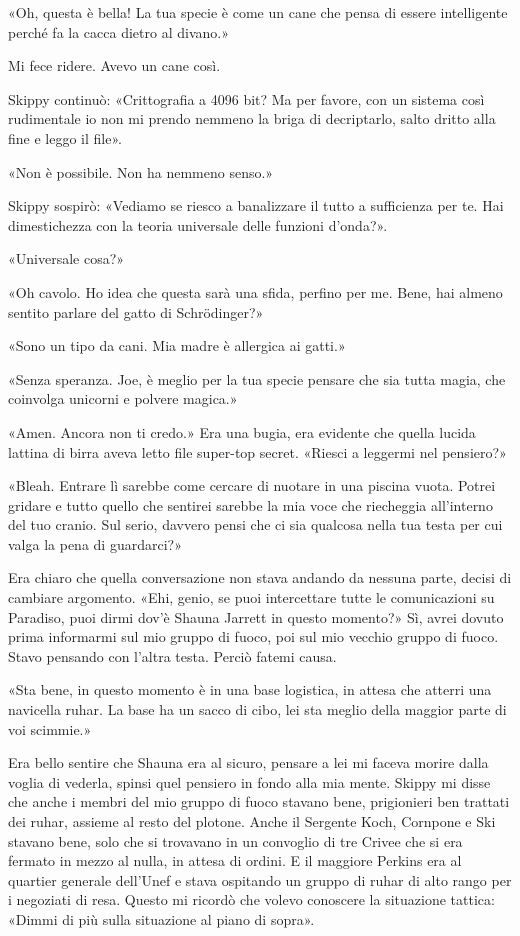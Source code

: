 «Oh, questa è bella! La tua specie è come un cane che pensa di essere
intelligente perché fa la cacca dietro al divano.»

Mi fece ridere. Avevo un cane così.

Skippy continuò: «Crittografia a 4096 bit? Ma per favore, con un sistema
così rudimentale io non mi prendo nemmeno la briga di decriptarlo, salto
dritto alla fine e leggo il file».

«Non è possibile. Non ha nemmeno senso.»

Skippy sospirò: «Vediamo se riesco a banalizzare il tutto a sufficienza
per te. Hai dimestichezza con la teoria universale delle funzioni
d'onda?».

«Universale cosa?»

«Oh cavolo. Ho idea che questa sarà una sfida, perfino per me. Bene, hai
almeno sentito parlare del gatto di Schrödinger?»

«Sono un tipo da cani. Mia madre è allergica ai gatti.»

«Senza speranza. Joe, è meglio per la tua specie pensare che sia tutta
magia, che coinvolga unicorni e polvere magica.»

«Amen. Ancora non ti credo.» Era una bugia, era evidente che quella
lucida lattina di birra aveva letto file super-top secret. «Riesci a
leggermi nel pensiero?»

«Bleah. Entrare lì sarebbe come cercare di nuotare in una piscina vuota.
Potrei gridare e tutto quello che sentirei sarebbe la mia voce che
riecheggia all'interno del tuo cranio. Sul serio, davvero pensi che ci
sia qualcosa nella tua testa per cui valga la pena di guardarci?»

Era chiaro che quella conversazione non stava andando da nessuna parte,
decisi di cambiare argomento. «Ehi, genio, se puoi intercettare tutte le
comunicazioni su Paradiso, puoi dirmi dov'è Shauna Jarrett in questo
momento?» Sì, avrei dovuto prima informarmi sul mio gruppo di fuoco, poi
sul mio vecchio gruppo di fuoco. Stavo pensando con l'altra testa.
Perciò fatemi causa.

«Sta bene, in questo momento è in una base logistica, in attesa che
atterri una navicella ruhar. La base ha un sacco di cibo, lei sta meglio
della maggior parte di voi scimmie.»

Era bello sentire che Shauna era al sicuro, pensare a lei mi faceva
morire dalla voglia di vederla, spinsi quel pensiero in fondo alla mia
mente. Skippy mi disse che anche i membri del mio gruppo di fuoco
stavano bene, prigionieri ben trattati dei ruhar, assieme al resto del
plotone. Anche il Sergente Koch, Cornpone e Ski stavano bene, solo che
si trovavano in un convoglio di tre Crivee che si era fermato in mezzo
al nulla, in attesa di ordini. E il maggiore Perkins era al quartier
generale dell'Unef e stava ospitando un gruppo di ruhar di alto rango
per i negoziati di resa. Questo mi ricordò che volevo conoscere la
situazione tattica: «Dimmi di più sulla situazione al piano di sopra».

